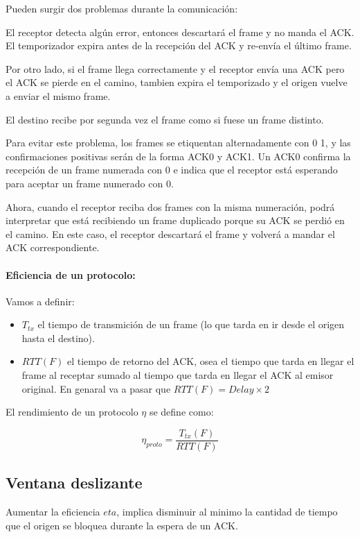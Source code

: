 Pueden surgir dos problemas durante la comunicación:
  
El receptor detecta algún error, entonces descartará el frame y no manda el ACK. El temporizador expira antes de la recepción del ACK y re-envía el último frame.

Por otro lado, si el frame llega correctamente y el receptor envía una ACK pero el ACK se pierde en el camino, tambien expira el temporizado y el origen vuelve a enviar el mismo frame. 
  
El destino recibe por segunda vez el frame como si fuese un frame distinto.

Para evitar este problema, los frames se etiquentan alternadamente con 0  1, y las confirmaciones positivas serán de la forma ACK0 y ACK1. Un ACK0 confirma la recepción de un frame numerada con 0 e indica que el receptor está esperando para aceptar un frame numerado con 0.

Ahora, cuando el receptor reciba dos frames con la misma numeración, podrá interpretar que está recibiendo un frame duplicado porque su ACK se perdió en el camino. En este caso, el receptor descartará el frame y volverá a mandar el ACK correspondiente.

\paragraph{Eficiencia de un protocolo:} 
Vamos a definir:
\begin{itemize}
  \item \(T_{tx}\) el tiempo de transmición de un frame (lo que tarda en ir desde el origen hasta el destino).
  \item \(RTT(F)\) el tiempo de retorno del ACK, osea el tiempo que tarda en llegar el frame al receptar sumado al tiempo que tarda en llegar el ACK al emisor original. En genaral va a pasar que \(RTT(F) = Delay\times 2\) 
\end{itemize}

El rendimiento de un protocolo \(\eta\) se define como:

\[\eta_{proto} = \frac{T_{tx}(F)}{RTT(F)}\]

\subsection{Ventana deslizante}\label{sec:ventana-deslizante}
Aumentar la eficiencia \(eta\), implica disminuir al minimo la cantidad de tiempo que el origen se bloquea durante la espera de un ACK.

